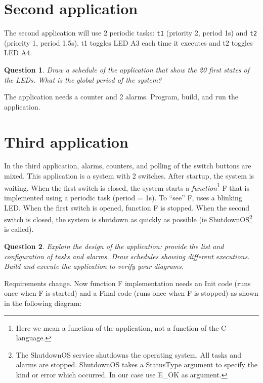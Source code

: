 \documentclass[11pt]{report}
\newtheorem{ex}{Question}
\begin{document}
\section{Second application}

The second application will use 2 periodic tasks: \texttt{t1} (priority 2, period 1s) and \texttt{t2} (priority 1, period 1.5s). t1 toggles LED A3 each time it executes and t2 toggles LED A4.

\begin{ex}
    Draw a schedule of the application that show the 20 first states of the LEDs.
    What is the global period of the system?
\end{ex}

The application needs a counter and 2 alarms. Program, build, and run the application.

\section{Third application}

In the third application, alarms, counters, and polling of the switch buttons are mixed.
This application is a system with 2 switches.
After startup, the system is waiting.
When the first switch is closed, the system starts a {\it function}\footnote{Here we mean a function of the application, not a function of the C language.} F that is implemented using a periodic task (period = 1s).
To ``see'' F, uses a blinking LED.
When the first switch is opened, function F is stopped.
When the second switch is closed, the system is shutdown as quickly as possible (ie ShutdownOS\footnote{The ShutdownOS service shutdowns the operating system. All tasks and alarms are stopped. ShutdownOS takes a StatusType argument to specify the kind or error which occurred. In our case use E\_OK as argument.} is called).

\begin{ex}
    Explain the design of the application: provide the list and configuration of tasks and alarms.
    Draw schedules showing different executions.
    Build and execute the application to verify your diagrams.
\end{ex}

Requirements change. Now function F implementation needs an Init code
(runs once when F is started) and a Final code (runs once when F is stopped) as shown in the following diagram:
\end{document}
